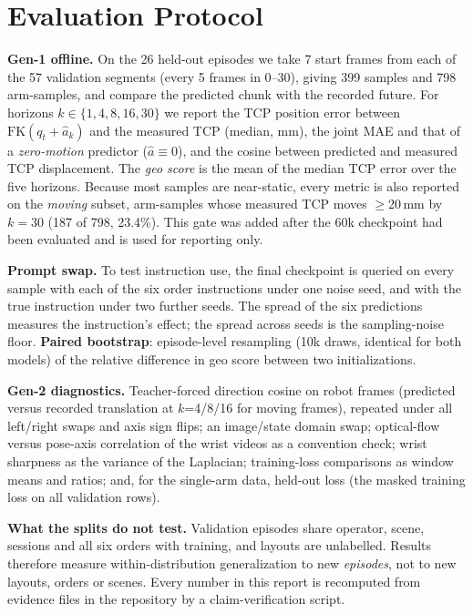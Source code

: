 \documentclass[conference,10pt]{IEEEtran}
\newcommand{\mm}{\,mm\xspace}
\begin{document}
\section{Evaluation Protocol}\label{sec:eval}
\textbf{Gen-1 offline.} On the 26 held-out episodes we take 7 start frames from each of the 57 validation segments (every 5 frames in
0--30), giving 399 samples and 798 arm-samples, and compare the predicted chunk with the recorded future. For horizons
$k\in\{1,4,8,16,30\}$ we report the TCP position error between $\mathrm{FK}(q_t+\hat a_k)$ and the measured TCP (median, mm), the
joint MAE and that of a \emph{zero-motion} predictor ($\hat a\equiv0$), and the cosine between predicted and measured TCP
displacement. The \emph{geo score} is the mean of the median TCP error over the five horizons. Because most samples are
near-static, every metric is also reported on the \emph{moving} subset, arm-samples whose measured TCP moves $\ge$20\mm by $k{=}30$
(187 of 798, 23.4\%). This gate was added after the 60k checkpoint had been evaluated and is used for reporting only.

\textbf{Prompt swap.} To test instruction use, the final checkpoint is queried on every sample with each of the six order
instructions under one noise seed, and with the true instruction under two further seeds. The spread of the six predictions
measures the instruction's effect; the spread across seeds is the sampling-noise floor. \textbf{Paired bootstrap}: episode-level
resampling (10k draws, identical for both models) of the relative difference in geo score between two initializations.

\textbf{Gen-2 diagnostics.} Teacher-forced direction cosine on robot frames (predicted versus recorded translation at $k$=4/8/16 for
moving frames), repeated under all left/right swaps and axis sign flips; an image/state domain swap; optical-flow versus pose-axis
correlation of the wrist videos as a convention check; wrist sharpness as the variance of the Laplacian; training-loss comparisons
as window means and ratios; and, for the single-arm data, held-out loss (the masked training loss on all validation rows).

\textbf{What the splits do not test.} Validation episodes share operator, scene, sessions and all six orders with training, and
layouts are unlabelled. Results therefore measure within-distribution generalization to new \emph{episodes}, not to new layouts,
orders or scenes. Every number in this report is recomputed from evidence files in the repository by a claim-verification script.
\end{document}

